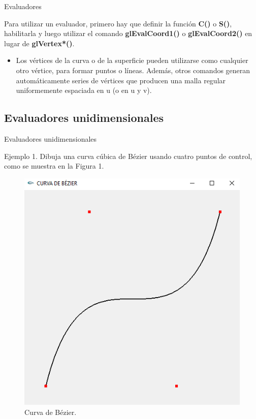\documentclass[10.5pt]{beamer}
\begin{document}
\begin{frame}{Evaluadores}
\begin{block}
\justifying
    Para utilizar un evaluador, primero hay que definir la función \textbf{C()} o \textbf{S()}, habilitarla y luego utilizar el comando \textbf{glEvalCoord1()} o \textbf{glEvalCoord2()} en lugar de \textbf{glVertex*()}.
\end{block}

\begin{itemize}
\justifying

    \item Los vértices de la curva o de la superficie pueden utilizarse como cualquier otro vértice, para formar puntos o líneas. Además, otros comandos generan automáticamente series de vértices que producen una malla regular uniformemente espaciada en u (o en u y v).
\end{itemize}
\end{frame}
\subsection{Evaluadores unidimensionales}

\begin{frame}{Evaluadores unidimensionales}
\begin{block}{Ejemplo 1.}
Dibuja una curva cúbica de Bézier usando cuatro puntos de control, como se muestra en la Figura 1.
\end{block}

\begin{figure}[h]
	\centering
	\includegraphics[width=0.5\linewidth]{figura/CURVA.PNG}
	\caption{Curva de Bézier.}
	\label{fig:propuesta}
\end{figure}

\end{frame}
\end{document}
